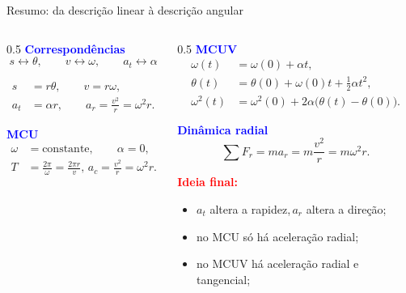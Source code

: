 \documentclass{beamer}
\begin{document}
	\begin{frame}{Resumo: da descrição linear à descrição angular}
		\scriptsize
		
		\begin{columns}[T]
			\begin{column}{0.5\textwidth}
				\textcolor{blue}{\textbf{Correspondências}}
				\[
				s \leftrightarrow \theta,
				\qquad
				v \leftrightarrow \omega,
				\qquad
				a_t \leftrightarrow \alpha
				\]
				
				\begin{align*}
					s &= r\theta, \qquad v = r\omega,\\
					a_t &= \alpha r, \qquad
					a_r = \frac{v^2}{r}=\omega^2 r.
				\end{align*}
				
				\vspace{0.1cm}
				\textcolor{blue}{\textbf{MCU}}
				\begin{align*}
					\omega &= \text{constante}, \qquad \alpha = 0,\\
					T &= \frac{2\pi}{\omega}=\frac{2\pi r}{v},\,a_c = \frac{v^2}{r}=\omega^2 r.
				\end{align*}
			\end{column}
			
			\begin{column}{0.5\textwidth}
				\textcolor{blue}{\textbf{MCUV}}
				\begin{align*}
					\omega(t) &= \omega(0)+\alpha t,\\
					\theta(t) &= \theta(0)+\omega(0)t+\frac{1}{2}\alpha t^2,\\
					\omega^2(t) &= \omega^2(0)+2\alpha\bigl(\theta(t)-\theta(0)\bigr).
				\end{align*}
				
				\vspace{0.1cm}
				\textcolor{blue}{\textbf{Dinâmica radial}}
				\begin{equation*}
					\sum F_r = m a_r = m\frac{v^2}{r}=m\omega^2 r.
				\end{equation*}
				
				\vspace{0.1cm}
				\textcolor{red}{\textbf{Ideia final:}}
				\begin{itemize}
					\item \(a_t\) altera a rapidez,\,\(a_r\) altera a direção;
					\item no MCU só há aceleração radial;
					\item no MCUV há aceleração radial e tangencial;
				\end{itemize}
			\end{column}
		\end{columns}
		
		
		
	\end{frame}
	
	
\end{document}
